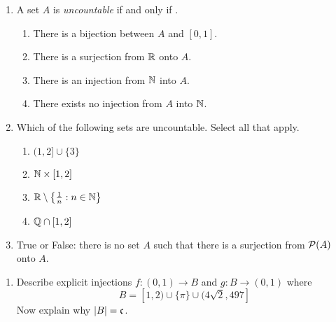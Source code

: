 \pagestyle{empty}


\begin{enumerate}
	\item A set $A$ is \emph{uncountable} if and only if \underline{\phantom{there exists no injection $f:A\to\N$\qquad\qquad}}.
  \begin{enumerate}
    \item There is a bijection between $A$ and $[0,1]$.
    \item There is a surjection from $\mathbb{R}$ onto $A$.
    \item There is an injection from $\mathbb{N}$ into $A$.
    \item There exists no injection from $A$ into $\mathbb{N}$.
  \end{enumerate}

  \item Which of the following sets are uncountable. Select all that apply.
  \begin{enumerate}
    \item $(1,2]\cup\{3\}$
    \item $\mathbb{N}\times[1,2]$
    \item $\mathbb{R}\setminus\left\{\tfrac 1n:n\in\mathbb{N}\right\}$
    \item $\mathbb{Q}\cap[1,2]$
  \end{enumerate}
    
  \item True or False: there is no set $A$ such that there is a surjection from $\mathcal{P}(A)$ onto $A$.
\end{enumerate}



\begin{enumerate}
	\item Describe explicit injections $f:(0,1)\to B$ and $g:B\to (0,1)$ where
	\[
		B=[1,2)\cup\{\pi\}\cup (4\sqrt 2,497]
	\]
	Now explain why $\left| B\right|=\mathfrak{c}$.
\end{enumerate}

